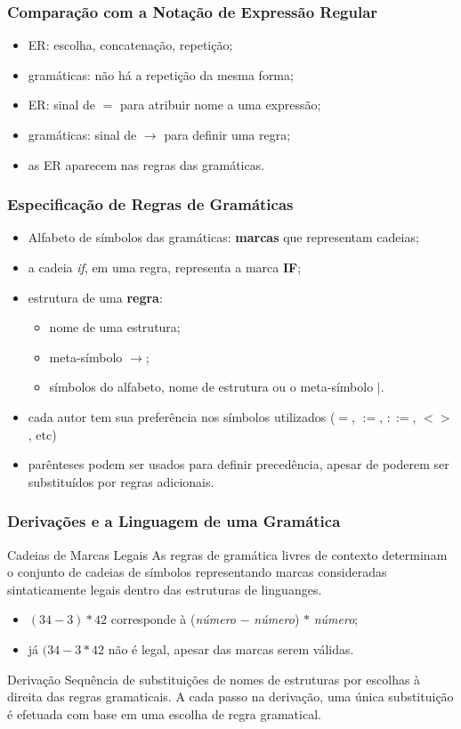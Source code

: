 \documentclass[table]{beamer}
\begin{document}
\begin{frame}
   \frametitle{Comparação com a Notação de Expressão Regular}
   \begin{itemize}
      \item ER: escolha, concatenação, repetição;
      \item gramáticas: não há a repetição da mesma forma;
      \item ER: sinal de $=$ para atribuir nome a uma expressão;
      \item gramáticas: sinal de $\to$ para definir uma regra;
      \item as ER aparecem nas regras das gramáticas.   
   \end{itemize}
\end{frame}

\begin{frame}
   \frametitle{Especificação de Regras de Gramáticas}
   \begin{itemize}
      \item Alfabeto de símbolos das gramáticas: \textbf{marcas} que representam cadeias;
      \item a cadeia \textit{if}, em uma regra, representa a marca \textbf{IF};
      \item estrutura de uma \textbf{regra}:
      \begin{itemize}
         \item nome de uma estrutura;
	 \item meta-símbolo $\to$;
	 \item símbolos do alfabeto, nome de estrutura ou o meta-símbolo $|$.
      \end{itemize}
      \item cada autor tem sua preferência nos símbolos utilizados ($=$, $:=$, $::=$, $<>$, etc) 
      \item parênteses podem ser usados para definir precedência, apesar de poderem ser substituídos por regras adicionais.
   \end{itemize}
\end{frame}

\begin{frame}
   \frametitle{Derivações e a Linguagem de uma Gramática}
   \begin{block}{Cadeias de Marcas Legais}
   As regras de gramática livres de contexto determinam o conjunto de cadeias de símbolos representando marcas consideradas sintaticamente legais dentro das estruturas de linguanges.
   \begin{itemize}
      \item $(34 - 3) * 42$ corresponde à (\textit{número} $-$ \textit{número}) $*$ \textit{número};
      \item já $(34 - 3 * 42$ não é legal, apesar das marcas serem válidas. 
   \end{itemize}
   \end{block}
   \begin{block}{Derivação}
   Sequência de substituições de nomes de estruturas por escolhas à direita das regras gramaticais. A cada passo na derivação, uma única substituição é efetuada com base em uma escolha de regra gramatical.
   \end{block}
\end{frame}
\end{document}
